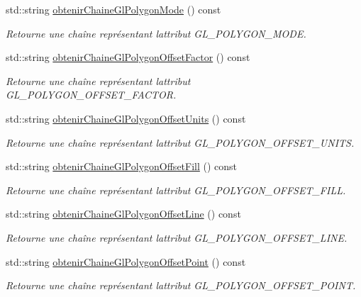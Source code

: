 \begin{DoxyCompactItemize}
std\+::string \hyperlink{group__utilitaire_ga799784d6a719eb2c25ffd5854ec09aa8}{obtenir\+Chaine\+Gl\+Polygon\+Mode} () const 
\begin{DoxyCompactList}\small\item\em Retourne une chaîne représentant l\textquotesingle{}attribut G\+L\+\_\+\+P\+O\+L\+Y\+G\+O\+N\+\_\+\+M\+O\+D\+E. \end{DoxyCompactList}\item 
std\+::string \hyperlink{group__utilitaire_gaedc33f5a28be70057bb4b6124b67955a}{obtenir\+Chaine\+Gl\+Polygon\+Offset\+Factor} () const 
\begin{DoxyCompactList}\small\item\em Retourne une chaîne représentant l\textquotesingle{}attribut G\+L\+\_\+\+P\+O\+L\+Y\+G\+O\+N\+\_\+\+O\+F\+F\+S\+E\+T\+\_\+\+F\+A\+C\+T\+O\+R. \end{DoxyCompactList}\item 
std\+::string \hyperlink{group__utilitaire_ga5e5f7eacf5333293ba0f1a02bbe3cdc5}{obtenir\+Chaine\+Gl\+Polygon\+Offset\+Units} () const 
\begin{DoxyCompactList}\small\item\em Retourne une chaîne représentant l\textquotesingle{}attribut G\+L\+\_\+\+P\+O\+L\+Y\+G\+O\+N\+\_\+\+O\+F\+F\+S\+E\+T\+\_\+\+U\+N\+I\+T\+S. \end{DoxyCompactList}\item 
std\+::string \hyperlink{group__utilitaire_gaa4f958b650aeedc92140b1406f98d985}{obtenir\+Chaine\+Gl\+Polygon\+Offset\+Fill} () const 
\begin{DoxyCompactList}\small\item\em Retourne une chaîne représentant l\textquotesingle{}attribut G\+L\+\_\+\+P\+O\+L\+Y\+G\+O\+N\+\_\+\+O\+F\+F\+S\+E\+T\+\_\+\+F\+I\+L\+L. \end{DoxyCompactList}\item 
std\+::string \hyperlink{group__utilitaire_ga7470a404bbcbef21d1316b3bfd02deb6}{obtenir\+Chaine\+Gl\+Polygon\+Offset\+Line} () const 
\begin{DoxyCompactList}\small\item\em Retourne une chaîne représentant l\textquotesingle{}attribut G\+L\+\_\+\+P\+O\+L\+Y\+G\+O\+N\+\_\+\+O\+F\+F\+S\+E\+T\+\_\+\+L\+I\+N\+E. \end{DoxyCompactList}\item 
std\+::string \hyperlink{group__utilitaire_ga19543110e1a7115a1ec9a30caaa490fe}{obtenir\+Chaine\+Gl\+Polygon\+Offset\+Point} () const 
\begin{DoxyCompactList}\small\item\em Retourne une chaîne représentant l\textquotesingle{}attribut G\+L\+\_\+\+P\+O\+L\+Y\+G\+O\+N\+\_\+\+O\+F\+F\+S\+E\+T\+\_\+\+P\+O\+I\+N\+T. \end{DoxyCompactList}\item 

\end{DoxyCompactItemize}
